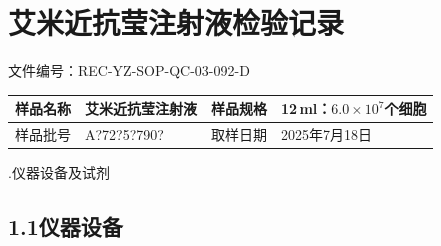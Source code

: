 \documentclass[UTF8,10pt,a4paper,fontset=fandol]{ctexart}
\newcommand{\fieldvalue}[1]{#1}
\newcommand{\handwritten}[1]{#1}
\begin{document}
\newpage

\section*{艾米近抗莹注射液检验记录}

\noindent 文件编号：REC-YZ-SOP-QC-03-092-D

\begin{tabularx}{\textwidth}{|l|X|l|X|}
\hline
样品名称 &
\fieldvalue{艾米近抗莹注射液} &
样品规格 &
\fieldvalue{12\,ml：$6.0\times10^{7}$个细胞}
\\ \hline
样品批号 &
\fieldvalue{\handwritten{A?72?5?790?}} &
取样日期 &
\fieldvalue{\handwritten{2025年7月18日}}
\\ \hline
\end{tabularx}

.\quad 仪器设备及试剂

\subsection*{1.1\quad 仪器设备}
\end{document}
